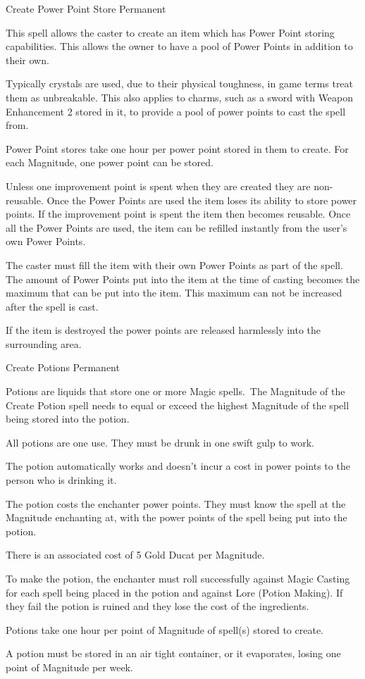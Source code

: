 \begin{rpg-spell}
{Create Power Point Store}
{Permanent}

This spell allows the caster to create an item which has Power Point storing capabilities. This allows the owner to have a pool of Power Points in addition to their own.

Typically crystals are used, due to their physical toughness, in game terms treat them as unbreakable. This also applies to charms, such as a sword with Weapon Enhancement 2 stored in it, to provide a pool of power points to cast the spell from.

Power Point stores take one hour per power point stored in them to create. For each Magnitude, one power point can be stored.

Unless one improvement point is spent when they are created they are non-reusable. Once the Power Points are used the item loses its ability to store power points. If the improvement point is spent the item then becomes reusable. Once all the Power Points are used, the item can be refilled instantly from the user’s own Power Points.

The caster must fill the item with their own Power Points as part of the spell. The amount of Power Points put into the item at the time of casting becomes the maximum that can be put into the item. This maximum can not be increased after the spell is cast.

If the item is destroyed the power points are released harmlessly into the surrounding area.
\end{rpg-spell}


\begin{rpg-spell}
{Create Potions}
{Permanent}

Potions are liquids that store one or more Magic spells. The Magnitude of the Create Potion spell needs to equal or exceed the highest Magnitude of the spell being stored into the potion.

\begin{rpg-list}
\item All potions are one use. They must be drunk in one swift gulp to work. 
\item The potion automatically works and doesn’t incur a cost in power points to the person who is drinking it. 
\item The potion costs the enchanter power points. They must know the spell at the Magnitude enchanting at, with the power points of the spell being put into the potion. 
\item There is an associated cost of 5 Gold Ducat per Magnitude. 
\item To make the potion, the enchanter must roll successfully against Magic Casting for each spell being placed in the potion and against Lore (Potion Making). If they fail the potion is ruined and they lose the cost of the ingredients. 
\item Potions take one hour per point of Magnitude of spell(s) stored to create. 
\item A potion must be stored in an air tight container, or it evaporates, losing one point of Magnitude per week. 
\end{rpg-list}
\end{rpg-spell}



